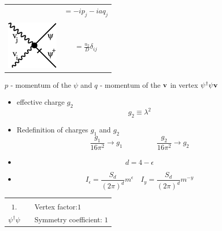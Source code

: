 \documentclass[12pt]{article}
\makeatletter
\newcommand{\psid}{\psi^{\dagger}}
\newcommand{\pociat}[4]{
\begin{table}[!ht]
\begin{tabular}{|c |c @{\hspace{2cm}} l}
\cline{1-1}
& \\ [-2ex]
\LARGE $#1 .$ & &{\large Vertex factor:}\qquad $#3$ \\ [0.5ex]
$#2$ & & {\large Symmetry coefficient:} \qquad $#4$ \\ \cline{1-1} 
\end{tabular}
\end{table}}
\makeatother
\begin{document}
\begin{table}[!ht]
\begin{tabular}{c c}
& \multirow{2}{*}{$=-i p_j -iaq_j$}\\
& \\
& \\[1ex]
\multirow{4}{*}{\includegraphics[width=2.5cm]{figure/vert4.eps}} &  \\
& \multirow{2}{*}{$= \frac{u_2}{D} \delta_{ij} $}\\
& \\
& \\[1ex]
\end{tabular}
\end{table} 

$p$ - momentum of the $\psi$ and $q$ - momentum of the ${\bf v}$ in vertex $\psid \psi {\bf v}$

\begin{itemize}
\item effective charge $g_2$
  \begin{equation}
    g_2 \equiv \lambda^2
  \end{equation}
\item Redefinition of charges $g_1$ and $g_2$
  \begin{equation}
    \frac{g_1}{16 \pi^2} \rightarrow  g_1 \hspace{2cm} \frac{g_2}{16 \pi^2} \rightarrow g_2 \nonumber
  \end{equation}
\item
   \begin{equation}
      d = 4 - \epsilon \nonumber
  \end{equation}
\item 
  \begin{equation}
     I_\epsilon = \frac{S_d}{(2\pi)^d} m^{ \epsilon} \quad I_y = \frac{S_d}{(2\pi)^d} m^{-y}
  \end{equation}
\end{itemize}

\newpage 

\pociat{1}{\psid  \psi}{1}{1}
\end{document}

